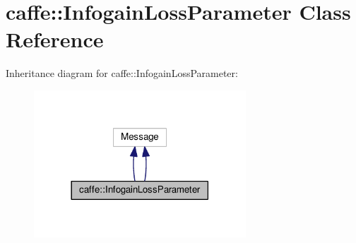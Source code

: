 \hypertarget{classcaffe_1_1_infogain_loss_parameter}{}\section{caffe\+:\+:Infogain\+Loss\+Parameter Class Reference}
\label{classcaffe_1_1_infogain_loss_parameter}


Inheritance diagram for caffe\+:\+:Infogain\+Loss\+Parameter\+:
\nopagebreak
\begin{figure}[H]
\begin{center}
\leavevmode
\includegraphics[width=225pt]{classcaffe_1_1_infogain_loss_parameter__inherit__graph}
\end{center}
\end{figure}
